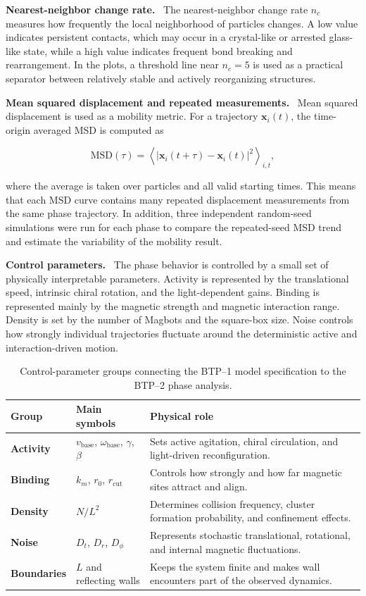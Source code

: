 \documentclass[12pt,a4paper,oneside]{report}
\newcommand{\runin}[1]{\vspace{0.45em}\noindent\textbf{#1.}\ }
\begin{document}
\runin{Nearest-neighbor change rate}
The nearest-neighbor change rate $n_c$ measures how frequently the local neighborhood of particles changes. A low value indicates persistent contacts, which may occur in a crystal-like or arrested glass-like state, while a high value indicates frequent bond breaking and rearrangement. In the plots, a threshold line near $n_c=5$ is used as a practical separator between relatively stable and actively reorganizing structures.

\runin{Mean squared displacement and repeated measurements}
Mean squared displacement is used as a mobility metric. For a trajectory $\mathbf{x}_i(t)$, the time-origin averaged MSD is computed as

\begin{equation}
\mathrm{MSD}(\tau)=
\left\langle
\left|\mathbf{x}_i(t+\tau)-\mathbf{x}_i(t)\right|^2
\right\rangle_{i,t},
\end{equation}

where the average is taken over particles and all valid starting times. This means that each MSD curve contains many repeated displacement measurements from the same phase trajectory. In addition, three independent random-seed simulations were run for each phase to compare the repeated-seed MSD trend and estimate the variability of the mobility result.

\runin{Control parameters}
The phase behavior is controlled by a small set of physically interpretable parameters. Activity is represented by the translational speed, intrinsic chiral rotation, and the light-dependent gains. Binding is represented mainly by the magnetic strength and magnetic interaction range. Density is set by the number of Magbots and the square-box size. Noise controls how strongly individual trajectories fluctuate around the deterministic active and interaction-driven motion.

\begin{table}[H]
\centering
\caption{Control-parameter groups connecting the BTP--1 model specification to the BTP--2 phase analysis.}
\label{tab:controlgroups}
\begin{tabularx}{\textwidth}{>{\bfseries}p{3.1cm}p{4.5cm}X}
\toprule
Group & Main symbols & Physical role \\
\midrule
Activity & $v_{\mathrm{base}}$, $\omega_{\mathrm{base}}$, $\gamma$, $\beta$ & Sets active agitation, chiral circulation, and light-driven reconfiguration. \\
Binding & $k_m$, $r_0$, $r_{\mathrm{cut}}$ & Controls how strongly and how far magnetic sites attract and align. \\
Density & $N/L^2$ & Determines collision frequency, cluster formation probability, and confinement effects. \\
Noise & $D_t$, $D_r$, $D_\phi$ & Represents stochastic translational, rotational, and internal magnetic fluctuations. \\
Boundaries & $L$ and reflecting walls & Keeps the system finite and makes wall encounters part of the observed dynamics. \\
\bottomrule
\end{tabularx}
\end{table}
\end{document}
